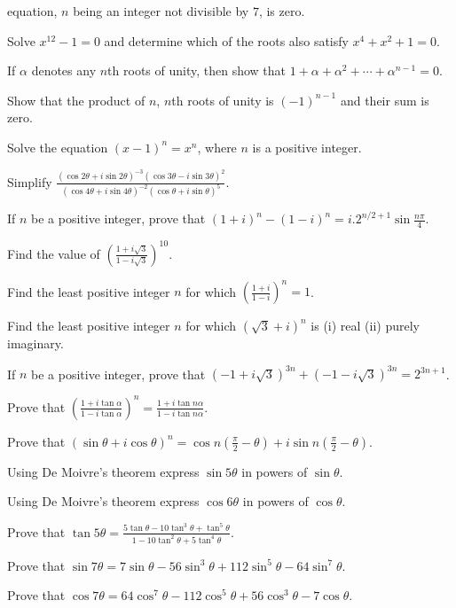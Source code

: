   equation, $n$ being an integer not divisible by $7$, is zero.
\item Solve $x^{12} - 1 = 0$ and determine which of the roots also satisfy $x^4 + x^2 + 1 = 0$.
\item If $\alpha$ denotes any $n$th roots of unity, then show that $1 + \alpha + \alpha^2 + \cdots +
  \alpha^{n - 1} = 0$.
\item Show that the product of $n$, $n$th roots of unity is $(-1)^{n - 1}$ and their sum is zero.
\item Solve the equation $(x - 1)^n = x^n$, where $n$ is a positive integer.
\item Simplify $\frac{(\cos2\theta + i\sin2\theta)^{-3}(\cos3\theta - i\sin3\theta)^2}{(\cos4\theta +
  i\sin4\theta)^{-2}(\cos\theta + i\sin\theta)^5}$.
\item If $n$ be a positive integer, prove that $(1 + i)^n - (1 - i)^n = i.2^{n/2 + 1}\sin\frac{n\pi}{4}$.
\item Find the value of $\left(\frac{1 + i\sqrt{3}}{1 - i\sqrt{3}}\right)^{10}$.
\item Find the least positive integer $n$ for which $\left(\frac{1 + i}{1 - i}\right)^n = 1$.
\item Find the least positive integer $n$ for which $(\sqrt{3} + i)^n$ is (i) real (ii) purely imaginary.
\item If $n$ be a positive integer, prove that $(-1 + i\sqrt{3})^{3n} + (-1 - i\sqrt{3})^{3n} = 2^{3n + 1}$.
\item Prove that $\left(\frac{1 + i\tan\alpha}{1 - i\tan\alpha}\right)^n = \frac{1 + i\tan n\alpha}{1 -
  i\tan n\alpha}$.
\item Prove that $(\sin\theta + i\cos\theta)^n = \cos n\left(\frac{\pi}{2} - \theta\right) + i\sin
  n\left(\frac{\pi}{2} - \theta\right)$.
\item Using De Moivre's theorem express $\sin5\theta$ in powers of $\sin\theta$.
\item Using De Moivre's theorem express $\cos6\theta$ in powers of $\cos\theta$.
\item Prove that $\tan5\theta = \frac{5\tan\theta - 10\tan^3\theta + \tan^5\theta}{1 - 10\tan^2\theta +
  5\tan^4\theta}$.
\item Prove that $\sin7\theta = 7\sin\theta - 56\sin^3\theta + 112\sin^5\theta - 64\sin^7\theta$.
\item Prove that $\cos7\theta = 64\cos^7\theta - 112\cos^5\theta + 56\cos^3\theta - 7\cos\theta$.
